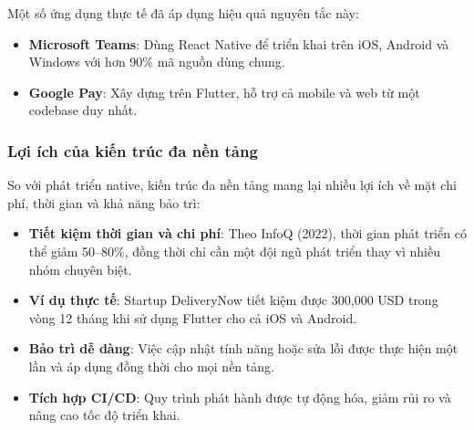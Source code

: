 \begin{flushleft}
    \hspace*{0.8cm}Một số ứng dụng thực tế đã áp dụng hiệu quả nguyên tắc này:
    \setlength{\leftmargini}{1.5cm}
    \begin{itemize}
        \item \textbf{Microsoft Teams}: Dùng React Native để triển khai trên iOS, Android và Windows với hơn 90\% mã nguồn dùng chung.
        \item \textbf{Google Pay}: Xây dựng trên Flutter, hỗ trợ cả mobile và web từ một codebase duy nhất.
    \end{itemize}
\end{flushleft}

\subsubsection{Lợi ích của kiến trúc đa nền tảng}
\begin{flushleft}
    \hspace*{0.8cm}So với phát triển native, kiến trúc đa nền tảng mang lại nhiều lợi ích về mặt chi phí, thời gian và khả năng bảo trì:
    \setlength{\leftmargini}{1.5cm}
    \begin{itemize}
        \item \textbf{Tiết kiệm thời gian và chi phí}: Theo InfoQ (2022), thời gian phát triển có thể giảm 50–80\%, đồng thời chỉ cần một đội ngũ phát triển thay vì nhiều nhóm chuyên biệt.
        \item \textbf{Ví dụ thực tế}: Startup DeliveryNow tiết kiệm được 300,000 USD trong vòng 12 tháng khi sử dụng Flutter cho cả iOS và Android.
        \item \textbf{Bảo trì dễ dàng}: Việc cập nhật tính năng hoặc sửa lỗi được thực hiện một lần và áp dụng đồng thời cho mọi nền tảng.
        \item \textbf{Tích hợp CI/CD}: Quy trình phát hành được tự động hóa, giảm rủi ro và nâng cao tốc độ triển khai.
    \end{itemize}
\end{flushleft}

